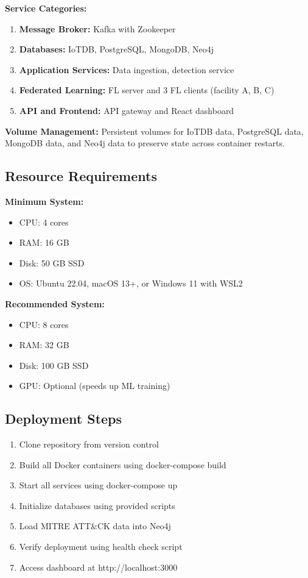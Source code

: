 \documentclass[12pt,a4paper]{article}
\begin{document}
\textbf{Service Categories:}

\begin{enumerate}[leftmargin=1cm,itemsep=0pt]
    \item \textbf{Message Broker:} Kafka with Zookeeper
    \item \textbf{Databases:} IoTDB, PostgreSQL, MongoDB, Neo4j
    \item \textbf{Application Services:} Data ingestion, detection service
    \item \textbf{Federated Learning:} FL server and 3 FL clients (facility A, B, C)
    \item \textbf{API and Frontend:} API gateway and React dashboard
\end{enumerate}

\textbf{Volume Management:}
Persistent volumes for IoTDB data, PostgreSQL data, MongoDB data, and Neo4j data to preserve state across container restarts.

\subsection{Resource Requirements}

\textbf{Minimum System:}
\begin{itemize}[leftmargin=1cm,itemsep=0pt]
    \item CPU: 4 cores
    \item RAM: 16 GB
    \item Disk: 50 GB SSD
    \item OS: Ubuntu 22.04, macOS 13+, or Windows 11 with WSL2
\end{itemize}

\textbf{Recommended System:}
\begin{itemize}[leftmargin=1cm,itemsep=0pt]
    \item CPU: 8 cores
    \item RAM: 32 GB
    \item Disk: 100 GB SSD
    \item GPU: Optional (speeds up ML training)
\end{itemize}

\subsection{Deployment Steps}

\begin{enumerate}[leftmargin=1cm,itemsep=0pt]
    \item Clone repository from version control
    \item Build all Docker containers using docker-compose build
    \item Start all services using docker-compose up
    \item Initialize databases using provided scripts
    \item Load MITRE ATT\&CK data into Neo4j
    \item Verify deployment using health check script
    \item Access dashboard at http://localhost:3000
\end{enumerate}
\end{document}
